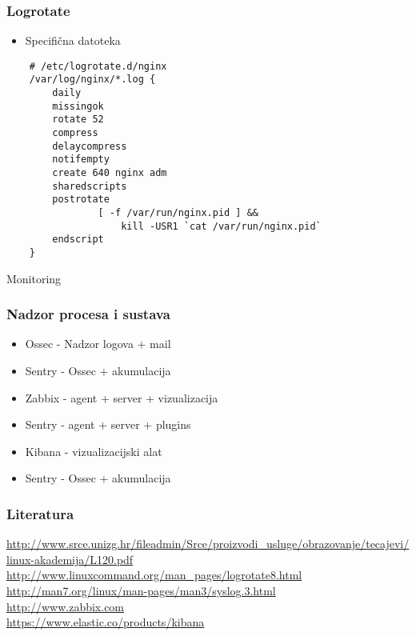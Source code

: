 \documentclass[t,table,usenames,dvipsnames]{beamer}
\begin{document}
\begin{frame}[fragile]
    \frametitle{Logrotate}
    \begin{itemize}
        \item Specifična datoteka
    \end{itemize}
    \begin{verbatim}
    # /etc/logrotate.d/nginx
    /var/log/nginx/*.log {
        daily
        missingok
        rotate 52
        compress
        delaycompress
        notifempty
        create 640 nginx adm
        sharedscripts
        postrotate
                [ -f /var/run/nginx.pid ] && 
                    kill -USR1 `cat /var/run/nginx.pid`
        endscript
    }

    \end{verbatim}

\end{frame}


\begin{frame}
    \vspace*{\fill}
        \begin{center}
            \Huge{Monitoring}
        \end{center}
    \vspace*{\fill}
\end{frame}


\begin{frame}
    \frametitle{Nadzor procesa i sustava}

    \begin{itemize}
        \item Ossec - Nadzor logova + mail
        \item Sentry - Ossec + akumulacija
        \item Zabbix - agent + server + vizualizacija
        \item Sentry - agent + server + plugins
        \item Kibana - vizualizacijski alat
        \item Sentry - Ossec + akumulacija
    \end{itemize}

\end{frame}

\begin{frame}
	\frametitle{Literatura}
	\url{http://www.srce.unizg.hr/fileadmin/Srce/proizvodi_usluge/obrazovanje/tecajevi/linux-akademija/L120.pdf}
	\vfill
	\url{http://www.linuxcommand.org/man_pages/logrotate8.html}\\
	\url{http://man7.org/linux/man-pages/man3/syslog.3.html}\\
	\vfill
	\url{http://www.zabbix.com}\\
	\vfill
	\url{https://www.elastic.co/products/kibana}\\
\end{frame}
\end{document}
